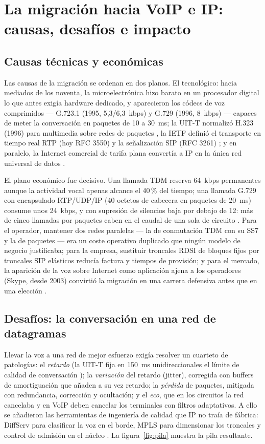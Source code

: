 \documentclass[12pt,a4paper]{article}
\begin{document}
\section{La migración hacia VoIP e IP: causas, desafíos e impacto}

\subsection{Causas técnicas y económicas}

Las causas de la migración se ordenan en dos planos. El tecnológico: hacia mediados de los noventa, la microelectrónica hizo barato en un procesador digital lo que antes exigía hardware dedicado, y aparecieron los códecs de voz comprimidos --- G.723.1 (1995, 5,3/6,3~kbps) y G.729 (1996, 8~kbps) --- capaces de meter la conversación en paquetes de 10 a 30~ms; la UIT-T normalizó H.323 (1996) para multimedia sobre redes de paquetes \cite{ituh323}, la IETF definió el transporte en tiempo real RTP (hoy RFC 3550) \cite{rfc3550} y la señalización SIP (RFC 3261) \cite{rfc3261}; y en paralelo, la Internet comercial de tarifa plana convertía a IP en la única red universal de datos \cite{goode2002}.

El plano económico fue decisivo. Una llamada TDM reserva 64~kbps permanentes aunque la actividad vocal apenas alcance el 40\,\% del tiempo; una llamada G.729 con encapsulado RTP/UDP/IP (40 octetos de cabecera en paquetes de 20~ms) consume unos 24~kbps, y con supresión de silencios baja por debajo de 12: más de cinco llamadas por paquetes caben en el caudal de una sola de circuito \cite{karapantazis2009, goode2002}. Para el operador, mantener dos redes paralelas --- la de conmutación TDM con su SS7 y la de paquetes --- era un coste operativo duplicado que ningún modelo de negocio justificaba; para la empresa, sustituir troncales RDSI de bloques fijos por troncales SIP elásticos reducía factura y tiempos de provisión; y para el mercado, la aparición de la voz sobre Internet como aplicación ajena a los operadores (Skype, desde 2003) convirtió la migración en una carrera defensiva antes que en una elección \cite{werbach2014}.

\subsection{Desafíos: la conversación en una red de datagramas}

Llevar la voz a una red de mejor esfuerzo exigía resolver un cuarteto de patologías: el \emph{retardo} (la UIT-T fija en 150~ms unidireccionales el límite de calidad de conversación \cite{itug114}); la \emph{variación} del retardo (jitter), corregida con buffers de amortiguación que añaden a su vez retardo; la \emph{pérdida} de paquetes, mitigada con redundancia, corrección y ocultación; y el \emph{eco}, que en los circuitos la red cancelaba y en VoIP deben cancelar los terminales con filtros adaptativos. A ello se añadieron las herramientas de ingeniería de calidad que IP no traía de fábrica: DiffServ para clasificar la voz en el borde, MPLS para dimensionar los troncales y control de admisión en el núcleo \cite{kurose2017, karapantazis2009}. La figura~\ref{fig:pila} muestra la pila resultante.
\end{document}
